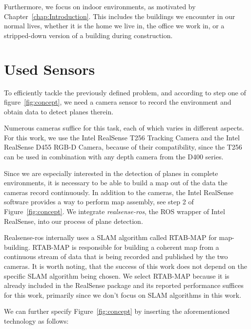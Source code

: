 \documentclass[main.tex]{subfiles}
\begin{document}
Furthermore, we focus on indoor environments, as motivated by Chapter~\ref{chap:Introduction}.
This includes the buildings we encounter in our normal lives, whether it is the home we live in, the office we work in, or a stripped-down version of a building during construction.




\section{Used Sensors}
To efficiently tackle the previously defined problem, and according to step one of figure~\ref{fig:concept}, we need a camera sensor to record the environment and obtain data to detect planes therein.

Numerous cameras suffice for this task, each of which varies in different aspects.
For this work, we use the Intel RealSense T256 Tracking Camera and the Intel RealSense D455 RGB-D Camera, because of their compatibility,
since the T256 can be used in combination with any depth camera from the D400 series.

Since we are especially interested in the detection of planes in complete environments, it is necessary to be able to build a map out of the data the cameras
record continuously.
In addition to the cameras, the Intel RealSense software provides a way to perform map assembly, see step 2 of Figure~\ref{fig:concept}.%
We integrate \textit{realsense-ros}, the ROS wrapper of Intel RealSense, into our process of plane detection.

Realsense-ros internally uses a SLAM algorithm called RTAB-MAP \cite{Labbé_Michaud_2019} for map-building.
RTAB-MAP is responsible for building a coherent map from a continuous stream of data that is being recorded and published by the two cameras.
It is worth noting, that the success of this work does not depend on the specific SLAM algorithm being chosen. We select RTAB-MAP because
it is already included in the RealSense package and its reported performance suffices for this work, primarily since we don't focus on SLAM
algorithms in this work.

We can further specify Figure~\ref{fig:concept} by inserting the aforementioned technology as follows:
\end{document}
